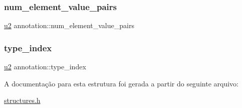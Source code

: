 \subsubsection{\texorpdfstring{num\+\_\+element\+\_\+value\+\_\+pairs}{num\_element\_value\_pairs}}
{\footnotesize\ttfamily \hyperlink{lista__operandos_8h_a732cde1300aafb73b0ea6c2558a7a54f}{u2} annotation\+::num\+\_\+element\+\_\+value\+\_\+pairs}

\mbox{\label{structannotation_ac1579f92b65639fa8646311a2520e58c}} 
\subsubsection{\texorpdfstring{type\+\_\+index}{type\_index}}
{\footnotesize\ttfamily \hyperlink{lista__operandos_8h_a732cde1300aafb73b0ea6c2558a7a54f}{u2} annotation\+::type\+\_\+index}



A documentação para esta estrutura foi gerada a partir do seguinte arquivo\+:\begin{DoxyCompactItemize}
\item 
\hyperlink{structures_8h}{structures.\+h}\end{DoxyCompactItemize}
